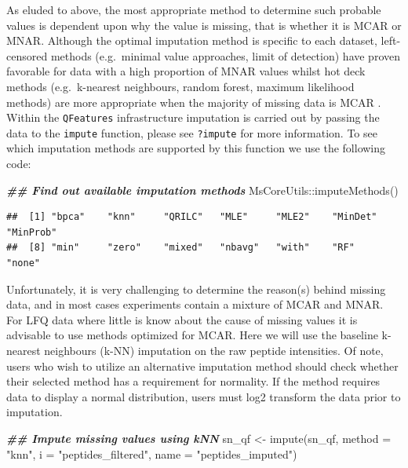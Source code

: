 \documentclass[9pt,a4paper,]{extarticle}
\newenvironment{Shaded}{\begin{snugshade}}{\end{snugshade}}
\newcommand{\AttributeTok}[1]{\textcolor[rgb]{0.77,0.63,0.00}{#1}}
\newcommand{\DocumentationTok}[1]{\textcolor[rgb]{0.56,0.35,0.01}{\textbf{\textit{#1}}}}
\newcommand{\FunctionTok}[1]{\textcolor[rgb]{0.00,0.00,0.00}{#1}}
\newcommand{\NormalTok}[1]{#1}
\newcommand{\OtherTok}[1]{\textcolor[rgb]{0.56,0.35,0.01}{#1}}
\newcommand{\SpecialCharTok}[1]{\textcolor[rgb]{0.00,0.00,0.00}{#1}}
\newcommand{\StringTok}[1]{\textcolor[rgb]{0.31,0.60,0.02}{#1}}
\begin{document}
As eluded to above, the most appropriate method to determine such probable
values is dependent upon why the value is missing, that is whether it is MCAR or
MNAR. Although the optimal imputation method is specific to each dataset,
left-censored methods (e.g.~minimal value approaches, limit of detection) have
proven favorable for data with a high proportion of MNAR values whilst hot deck
methods (e.g.~k-nearest neighbours, random forest, maximum likelihood methods)
are more appropriate when the majority of missing data is MCAR \citep[e.g.,][]{Liu2021, Lazar2016}. Within the \texttt{QFeatures} infrastructure imputation is carried out by
passing the data to the \texttt{impute} function, please see \texttt{?impute} for more
information. To see which imputation methods are supported by this function we
use the following code:

\begin{Shaded}
\begin{Highlighting}[]
\DocumentationTok{\#\# Find out available imputation methods}
\NormalTok{MsCoreUtils}\SpecialCharTok{::}\FunctionTok{imputeMethods}\NormalTok{()}
\end{Highlighting}
\end{Shaded}

\begin{verbatim}
##  [1] "bpca"    "knn"     "QRILC"   "MLE"     "MLE2"    "MinDet"  "MinProb"
##  [8] "min"     "zero"    "mixed"   "nbavg"   "with"    "RF"      "none"
\end{verbatim}

Unfortunately, it is very challenging to determine the reason(s) behind missing
data, and in most cases experiments contain a mixture of MCAR and MNAR. For LFQ
data where little is know about the cause of missing values it is advisable to
use methods optimized for MCAR. Here we will use the baseline k-nearest
neighbours (k-NN) imputation on the raw peptide intensities. Of note, users who
wish to utilize an alternative imputation method should check whether their
selected method has a requirement for normality. If the method requires data to
display a normal distribution, users must log2 transform the data prior to
imputation.

\begin{Shaded}
\begin{Highlighting}[]
\DocumentationTok{\#\# Impute missing values using kNN}
\NormalTok{sn\_qf }\OtherTok{\textless{}{-}} \FunctionTok{impute}\NormalTok{(sn\_qf,}
                \AttributeTok{method =} \StringTok{"knn"}\NormalTok{, }
                \AttributeTok{i =} \StringTok{"peptides\_filtered"}\NormalTok{,}
                \AttributeTok{name =} \StringTok{"peptides\_imputed"}\NormalTok{)}
\end{Highlighting}
\end{Shaded}
\end{document}
